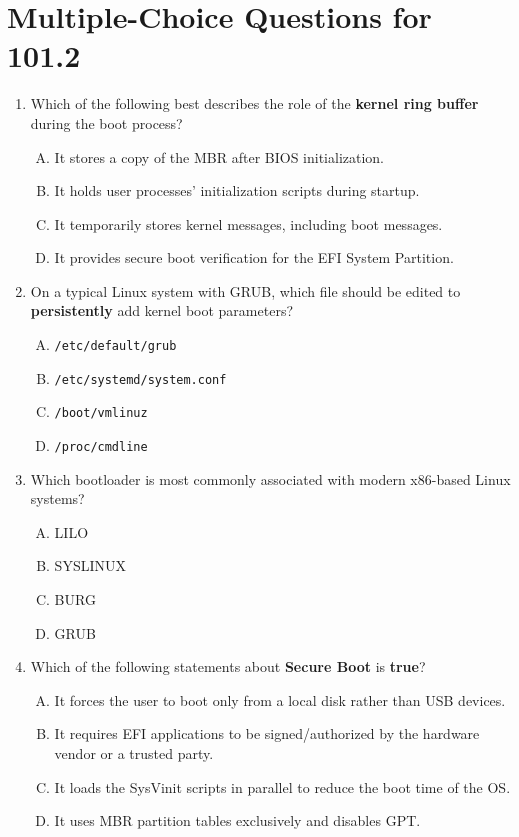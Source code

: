 \documentclass[a4paper]{report}
\begin{document}
\newpage
\section*{Multiple-Choice Questions for 101.2}

\begin{enumerate}[1.]
    \item Which of the following best describes the role of the \textbf{kernel ring buffer} during the boot process?
      \begin{enumerate}[A)]
        \item It stores a copy of the MBR after BIOS initialization.
        \item It holds user processes’ initialization scripts during startup.
        \item It temporarily stores kernel messages, including boot messages.
        \item It provides secure boot verification for the EFI System Partition.
      \end{enumerate}
    
    \item On a typical Linux system with GRUB, which file should be edited to \textbf{persistently} add kernel boot parameters?
      \begin{enumerate}[A)]
        \item \texttt{/etc/default/grub}
        \item \texttt{/etc/systemd/system.conf}
        \item \texttt{/boot/vmlinuz}
        \item \texttt{/proc/cmdline}
      \end{enumerate}
    
    \item Which bootloader is most commonly associated with modern x86-based Linux systems?
      \begin{enumerate}[A)]
        \item LILO
        \item SYSLINUX
        \item BURG
        \item GRUB
      \end{enumerate}
    
    \item Which of the following statements about \textbf{Secure Boot} is \textbf{true}?
      \begin{enumerate}[A)]
        \item It forces the user to boot only from a local disk rather than USB devices.
        \item It requires EFI applications to be signed/authorized by the hardware vendor or a trusted party.
        \item It loads the SysVinit scripts in parallel to reduce the boot time of the OS.
        \item It uses MBR partition tables exclusively and disables GPT.
      \end{enumerate}
    

\end{enumerate}
\end{document}
